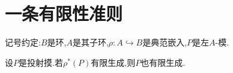 \section{一条有限性准则}

记号约定:$B$是环,$A$是其子环,$\rho:A\hookrightarrow B$是典范嵌入,$P$是左$A$-模.

\begin{proposition}{}{}
	设$P$是投射摸.若$\rho^{\ast}\left(P\right)$有限生成,则$P$也有限生成.
\end{proposition}